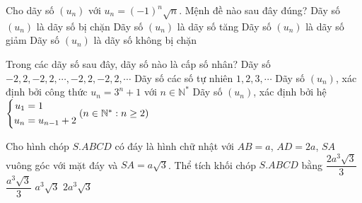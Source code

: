 \begin{ex}%
	Cho dãy số $(u_n)$ với $u_n=(-1)^n\sqrt{n}$. Mệnh đề nào sau đây đúng?
	\choice
	{Dãy số $(u_n)$ là dãy số bị chặn}
	{Dãy số $(u_n)$ là dãy số tăng}
	{Dãy số $(u_n)$ là dãy số giảm}
	{\True Dãy số $(u_n)$ là dãy số không bị chặn}
\end{ex}
\begin{ex}%
Trong các dãy số sau đây, dãy số nào là cấp số nhân?	
	\choice
	{\True Dãy số $-2,2,-2,2,\cdots,-2,2,-2,2,\cdots$}
	{Dãy số các số tự nhiên $1,2,3,\cdots$}
	{Dãy số $(u_n)$, xác định bởi công thức $u_n=3^n+1$ với $n\in \mathbb{N}^{*}$}
	{Dãy số $(u_n)$, xác định bởi hệ $\left\{\begin{aligned}u_1&=1\\u_n&=u_{n-1}+2\end{aligned}\right. (n \in \mathbb{N}^{*}: n\geq 2)$}
\end{ex}
\begin{ex}%
Cho hình chóp $S.ABCD$ có đáy là hình chữ nhật với $AB= a$, $AD= 2a$, $SA$ vuông góc với mặt đáy và $SA= a \sqrt{3}$. Thể tích khối chóp $S.ABCD$ bằng 	
	\choice
	{\True $ \dfrac{2a^3 \sqrt{3}}{3} $}
	{$ \dfrac{a^3\sqrt{3}}{3} $}
	{$ a^3\sqrt{3} $}
	{$ 2a^3\sqrt{3} $}
\end{ex}
